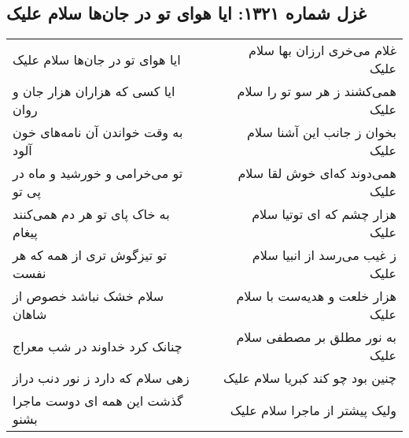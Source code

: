 \begin{center}
\section*{غزل شماره ۱۳۲۱: ایا هوای تو در جان‌ها سلام علیک}
\label{sec:1321}
\begin{longtable}{l p{0.5cm} r}
ایا هوای تو در جان‌ها سلام علیک
&&
غلام می‌خری ارزان بها سلام علیک
\\
ایا کسی که هزاران هزار جان و روان
&&
همی‌کشند ز هر سو تو را سلام علیک
\\
به وقت خواندن آن نامه‌های خون آلود
&&
بخوان ز جانب این آشنا سلام علیک
\\
تو می‌خرامی و خورشید و ماه در پی تو
&&
همی‌دوند که‌ای خوش لقا سلام علیک
\\
به خاک پای تو هر دم همی‌کنند پیغام
&&
هزار چشم که ای توتیا سلام علیک
\\
تو تیزگوش تری از همه که هر نفست
&&
ز غیب می‌رسد از انبیا سلام علیک
\\
سلام خشک نباشد خصوص از شاهان
&&
هزار خلعت و هدیه‌ست با سلام علیک
\\
چنانک کرد خداوند در شب معراج
&&
به نور مطلق بر مصطفی سلام علیک
\\
زهی سلام که دارد ز نور دنب دراز
&&
چنین بود چو کند کبریا سلام علیک
\\
گذشت این همه ای دوست ماجرا بشنو
&&
ولیک پیشتر از ماجرا سلام علیک
\\
\end{longtable}
\end{center}
